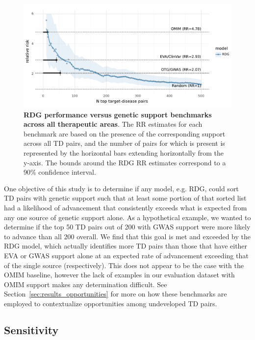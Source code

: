 \documentclass{article}
\begin{document}
\begin{figure}[!htb]
  \centering
  \captionsetup{width=.9\linewidth}
  \includegraphics[width=1\textwidth]{relative_risk_by_limit.pdf}
  \caption{
    \textbf{RDG performance versus genetic support benchmarks across all therapeutic areas}. The RR estimates for each benchmark are based on the presence of the corresponding support across all TD pairs, and the number of pairs for which is present is represented by the horizontal bars extending horizontally from the y-axis. The bounds around the RDG RR estimates correspond to a 90\% confidence interval.
  }
  \label{fig:relative_risk_by_limit}
\end{figure}

One objective of this study is to determine if any model, e.g. RDG, could sort TD pairs with genetic support such that at least some portion of that sorted list had a likelihood of advancement that consistently exceeds what is expected from any one source of genetic support alone. As a hypothetical example, we wanted to determine if the top 50 TD pairs out of 200 with GWAS support were more likely to advance than all 200 overall. We find that this goal is met and exceeded by the RDG model, which actually identifies more TD pairs than those that have either EVA or GWAS support alone at an expected rate of advancement exceeding that of the single source (respectively). This does not appear to be the case with the OMIM baseline, however the lack of examples in our evaluation dataset with OMIM support makes any determination difficult. See Section~\ref{sec:results_opportunities} for more on how these benchmarks are employed to contextualize opportunities among undeveloped TD pairs.

\subsection{Sensitivity}
\end{document}
